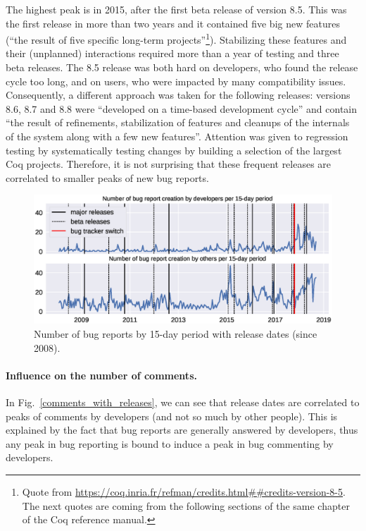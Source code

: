 \documentclass[runningheads]{llncs}
\begin{document}
The highest peak is in 2015, after the first beta release of version 8.5. This was the first release in more than two years and it contained five big new features (``the result of five specific long-term projects''\footnote{Quote from \url{https://coq.inria.fr/refman/credits.html##credits-version-8-5}. The next quotes are coming from the following sections of the same chapter of the Coq reference manual.}). Stabilizing these features and their (unplanned) interactions required more than a year of testing and three beta releases. The 8.5 release was both hard on developers, who found the release cycle too long, and on users, who were impacted by many compatibility issues. Consequently, a different approach was taken for the following releases: versions 8.6, 8.7 and 8.8 were ``developed on a time-based development cycle'' and contain ``the result of refinements, stabilization of features and cleanups of the internals of the system along with a few new features''. Attention was given to regression testing by systematically testing changes by building a selection of the largest Coq projects. Therefore, it is not surprising that these frequent releases are correlated to smaller peaks of new bug reports.

\begin{figure}
\includegraphics[width=\textwidth]{bug_nb_with_releases.eps}
\caption{Number of bug reports by 15-day period with release dates (since 2008).} \label{bug_nb_with_releases}
\end{figure}

\paragraph{Influence on the number of comments.}
In Fig.~\ref{comments_with_releases}, we can see that release dates are correlated to peaks of comments by developers (and not so much by other people). This is explained by the fact that bug reports are generally answered by developers, thus any peak in bug reporting is bound to induce a peak in bug commenting by developers.
\end{document}
